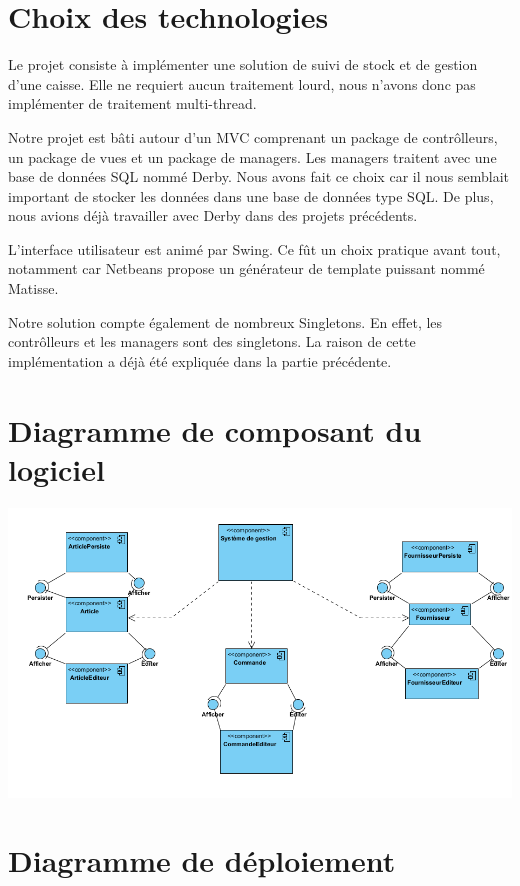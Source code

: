 \section{Choix des technologies}
Le projet consiste à implémenter une solution de suivi de stock et de gestion d'une caisse. Elle ne requiert aucun traitement lourd, nous n'avons donc pas implémenter de traitement multi-thread. 

Notre projet est bâti autour d'un MVC comprenant un package de contrôlleurs, un package de vues et un package de managers. Les managers traitent avec une base de données SQL nommé Derby. Nous avons fait ce choix car il nous semblait important de stocker les données dans une base de données type SQL. De plus, nous avions déjà travailler avec Derby dans des projets précédents.

L'interface utilisateur est animé par Swing. Ce fût un choix pratique avant tout, notamment car Netbeans propose un générateur de template puissant nommé Matisse.

Notre solution compte également de nombreux Singletons. En effet, les contrôlleurs et les managers sont des singletons. La raison de cette implémentation a déjà été expliquée dans la partie précédente.

\section{Diagramme de composant du logiciel}

\begin{center}
	\includegraphics[width=14cm]{./Conception/diagrammeComposant}
\end{center}

\section{Diagramme de déploiement}

